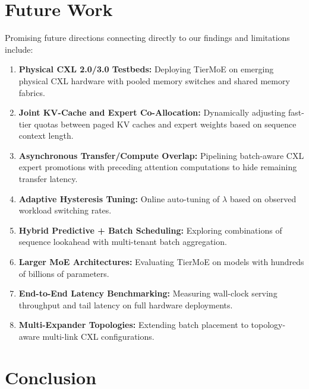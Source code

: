 \documentclass[10pt,journal,compsoc]{IEEEtran}
\begin{document}
\section{Future Work}
\label{sec:future_work}

Promising future directions connecting directly to our findings and limitations include:
\begin{enumerate}
    \item \textbf{Physical CXL 2.0/3.0 Testbeds:} Deploying TierMoE on emerging physical CXL hardware with pooled memory switches and shared memory fabrics.
    \item \textbf{Joint KV-Cache and Expert Co-Allocation:} Dynamically adjusting fast-tier quotas between paged KV caches and expert weights based on sequence context length.
    \item \textbf{Asynchronous Transfer/Compute Overlap:} Pipelining batch-aware CXL expert promotions with preceding attention computations to hide remaining transfer latency.
    \item \textbf{Adaptive Hysteresis Tuning:} Online auto-tuning of $\lambda$ based on observed workload switching rates.
    \item \textbf{Hybrid Predictive + Batch Scheduling:} Exploring combinations of sequence lookahead with multi-tenant batch aggregation.
    \item \textbf{Larger MoE Architectures:} Evaluating TierMoE on models with hundreds of billions of parameters.
    \item \textbf{End-to-End Latency Benchmarking:} Measuring wall-clock serving throughput and tail latency on full hardware deployments.
    \item \textbf{Multi-Expander Topologies:} Extending batch placement to topology-aware multi-link CXL configurations.
\end{enumerate}

\section{Conclusion}
\label{sec:conclusion}
\end{document}
